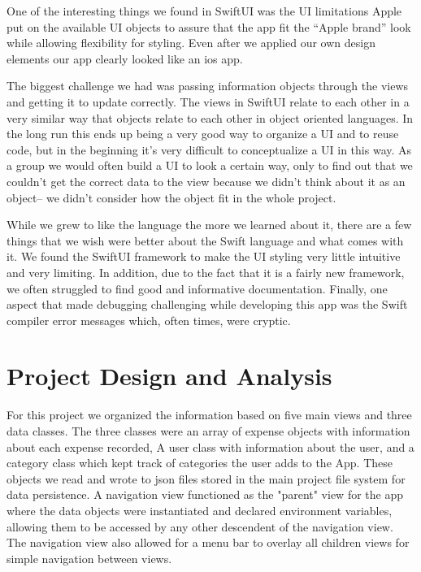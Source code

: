 \documentclass{article}
\begin{document}
\vskip 0.2in

One of the interesting things we found in SwiftUI was the UI limitations Apple put on the available UI objects to assure that the app fit the “Apple brand” look while allowing flexibility for styling. Even after we applied our own design elements our app clearly looked like an ios app. \par

\vskip 0.2in

The biggest challenge we had was passing information objects through the views and getting it to update correctly. The views in SwiftUI relate to each other in a very similar way that objects relate to each other in object oriented languages. In the long run this ends up being a very good way to organize a UI and to reuse code, but in the beginning it’s very difficult to conceptualize a UI in this way. As a group we would often build a UI to look a certain way, only to find out that we couldn't get the correct data to the view because we didn't think about it as an object-- we didn't consider how the object fit in the whole project. 

\vskip 0.2in

While we grew to like the language the more we learned about it, there are a few things that we wish were better about the Swift language and what comes with it. We found the SwiftUI framework to make the UI styling very little intuitive and very limiting. In addition, due to the fact that it is a fairly new framework, we often struggled to find good and informative documentation. Finally, one aspect that made debugging challenging while developing this app was the Swift compiler error messages which, often times, were cryptic. 

\section{Project Design and Analysis}

For this project we organized the information based on five main views and three data classes. The three classes were an array of expense objects with information about each expense recorded, A user class with information about the user, and a category class which kept track of categories the user adds to the App. These objects we read and wrote to json files stored in the main project file system for data persistence. A navigation view functioned as the "parent" view for the app where the data objects were instantiated and declared environment variables, allowing them to be accessed by any other descendent of the navigation view. The navigation view also allowed for a menu bar to overlay all children views for simple navigation between views.
\end{document}
